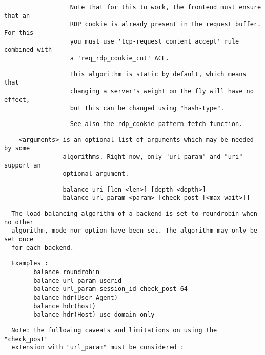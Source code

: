 \begin{verbatim}
                  Note that for this to work, the frontend must ensure that an
                  RDP cookie is already present in the request buffer. For this
                  you must use 'tcp-request content accept' rule combined with
                  a 'req_rdp_cookie_cnt' ACL.
\end{verbatim}

\begin{verbatim}
                  This algorithm is static by default, which means that
                  changing a server's weight on the fly will have no effect,
                  but this can be changed using "hash-type".
\end{verbatim}

\begin{verbatim}
                  See also the rdp_cookie pattern fetch function.
\end{verbatim}

\begin{verbatim}
    <arguments> is an optional list of arguments which may be needed by some
                algorithms. Right now, only "url_param" and "uri" support an
                optional argument.
\end{verbatim}

\begin{verbatim}
                balance uri [len <len>] [depth <depth>]
                balance url_param <param> [check_post [<max_wait>]]
\end{verbatim}

\begin{verbatim}
  The load balancing algorithm of a backend is set to roundrobin when no other
  algorithm, mode nor option have been set. The algorithm may only be set once
  for each backend.
\end{verbatim}

\begin{verbatim}
  Examples :
        balance roundrobin
        balance url_param userid
        balance url_param session_id check_post 64
        balance hdr(User-Agent)
        balance hdr(host)
        balance hdr(Host) use_domain_only
\end{verbatim}

\begin{verbatim}
  Note: the following caveats and limitations on using the "check_post"
  extension with "url_param" must be considered :
\end{verbatim}


